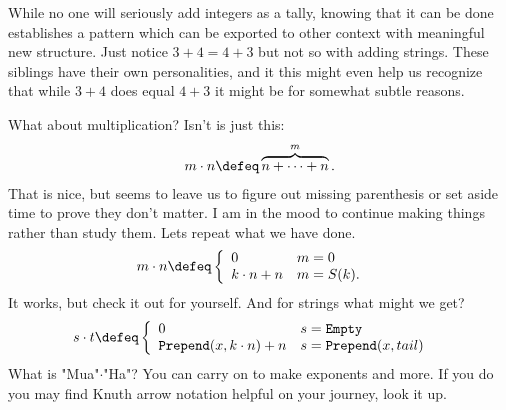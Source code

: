While no one will seriously add integers as a tally, 
knowing that it can be done establishes a pattern which can be exported to other context
with meaningful new structure.  Just notice $3+4=4+3$ but not so with adding strings.
These siblings have their own personalities, and it this might even help us recognize 
that while $3+4$ does equal $4+3$ it might be for somewhat subtle reasons.

What about multiplication? Isn't is just this:
\begin{align*}
    m\cdot n\defeq \overbrace{n+\cdots +n}^m.
\end{align*}
That is nice, but seems to leave us to figure out missing parenthesis or set aside 
time to prove they don't matter.  I am in the mood to continue making things rather 
than study them.  Lets repeat what we have done.
\begin{align*}
    m\cdot n & \defeq \left\{
        \begin{array}{ll}
            0 & m=0\\
            k\cdot n+n & m=S(k).
        \end{array}
    \right.
\end{align*}
It works, but check it out for yourself.  And for strings what might we get?
\begin{align*}
    s\cdot t & \defeq \left\{
        \begin{array}{ll}
            0 & s=\texttt{Empty}\\
            \texttt{Prepend}(x,k\cdot n)+n & s=\texttt{Prepend}(x,tail)
        \end{array}
    \right.
\end{align*}
What is "Mua"$\cdot$"Ha"?
You can carry on to make exponents and more.  If you do you may find 
Knuth arrow notation helpful on your journey, look it up.



